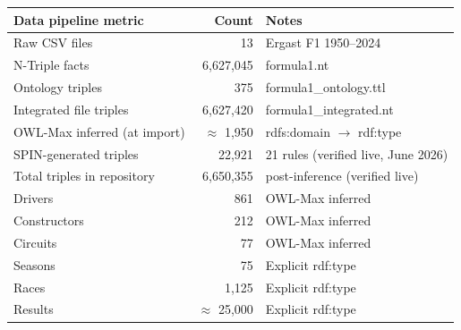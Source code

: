 \begin{center}
\begin{tabular}{@{}lrl@{}}
\toprule
\textbf{Data pipeline metric} & \textbf{Count} & \textbf{Notes} \\
\midrule
Raw CSV files                & 13  & Ergast F1 1950--2024 \\
N-Triple facts               & 6{,}627{,}045 & formula1.nt \\
Ontology triples             & 375 & formula1\_ontology.ttl \\
Integrated file triples      & 6{,}627{,}420 & formula1\_integrated.nt \\
OWL-Max inferred (at import) & $\approx$ 1{,}950 & rdfs:domain $\to$ rdf:type \\
SPIN-generated triples       & 22{,}921 & 21 rules (verified live, June 2026) \\
Total triples in repository  & 6{,}650{,}355 & post-inference (verified live) \\
\midrule
Drivers                      & 861 & OWL-Max inferred \\
Constructors                 & 212 & OWL-Max inferred \\
Circuits                     & 77  & OWL-Max inferred \\
Seasons                      & 75  & Explicit rdf:type \\
Races                        & 1{,}125 & Explicit rdf:type \\
Results                      & $\approx$ 25{,}000 & Explicit rdf:type \\
\bottomrule
\end{tabular}
\end{center}

\vspace{0.8em}

